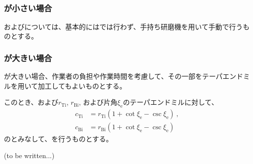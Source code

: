 \subsection{\EndFaceInRChamferMilling}

\subsubsection{\EndFaceInRChamferRadius が小さい場合}
\TopEndFaceInRChamferMilling および\BottomEndFaceInRChamferMilling については、基本的には\MMC では行わず、手持ち研磨機を用いて手動で行うものとする。

\subsubsection{\EndFaceInRChamferRadius が大きい場合}
\EndFaceInRChamferRadius が大きい場合、作業者の負担や作業時間を考慮して、その一部をテーパエンドミルを用いて加工してもよいものとする。

このとき、\TopEndFaceInRChamferRadius および\BottomFaceInRChamferRadius$r_\mathrm{Ti}$, $r_\mathrm{Bi}$, および片角$\xi_\mathrm e$のテーパエンドミルに対して、
\begin{align*}
  c_\mathrm{Ti} &= r_\mathrm{Ti}\left(1+\cot\xi_\mathrm e-\csc\xi_\mathrm e\right)\ ,\\
  c_\mathrm{Bi} &= r_\mathrm{Bi}\left(1+\cot\xi_\mathrm e-\csc\xi_\mathrm e\right)
\end{align*}
の\EndFaceCChamferLength とみなして、\EndFaceInCChamferMilling を行うものとする。



\clearpage
(to be written...)


